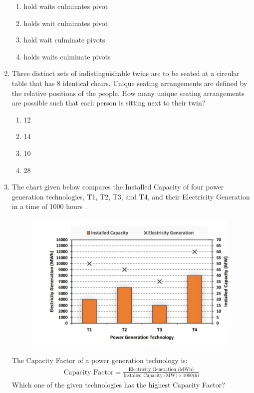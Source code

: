 \documentclass[journal,12pt,onecolumn]{article}
\theoremstyle{remark}
\begin{document}
\begin{enumerate}
    \hfill{}
    \begin{enumerate}
        \item {} hold  waits  culminates  pivot
        \item {} holds  wait  culminates  pivot
        \item {} hold  wait  culminate  pivots
        \item {} holds  waits  culminate  pivots
    \end{enumerate}

    \item Three distinct sets of indistinguishable twins are to be seated at a circular table that has 8 identical chairs. Unique seating arrangements are defined by the relative positions of the people. How many unique seating arrangements are possible such that each person is sitting next to their twin?

    \hfill{}
    \begin{enumerate}
        \item 12
        \item 14
        \item 10
        \item 28
    \end{enumerate}

    \item The chart given below  compares the Installed Capacity  of four power generation technologies, T1, T2, T3, and T4, and their Electricity Generation  in a time of 1000 hours .
    \begin{figure}[H]
        \centering
        \includegraphics[width=0.7\columnwidth]{figs/1Q8.jpg}
        \caption{}
        \label{fig:q8}
    \end{figure}
    The Capacity Factor of a power generation technology is:
    \begin{align}
    \text{Capacity Factor} = \frac{\text{Electricity Generation (MWh)}}{\text{Installed Capacity (MW)} \times 1000 \text{(h)}}
    \end{align}
    Which one of the given technologies has the highest Capacity Factor?


\end{enumerate}
\end{document}
